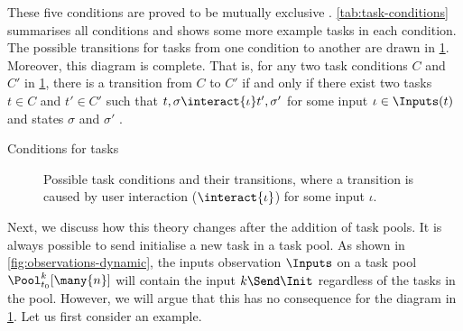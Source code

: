 These five conditions are proved to be mutually exclusive .
\cref{tab:task-conditions} summarises all conditions
and shows some more example tasks in each condition.
The possible transitions for tasks from one condition to another are drawn in \cref{fig:task-conditions}.
Moreover, this diagram is complete.
That is, for any two task conditions $C$ and $C'$ in \cref{fig:task-conditions},
there is a transition from $C$ to $C'$
if and only if there exist two tasks $t \in C$ and $t' \in C'$ such that
$t,\sigma \interact{\iota} t',\sigma'$ for some input $\iota \in \Inputs(t)$ and states $\sigma$ and $\sigma'$ .

\begin{table}
  
  \caption{Conditions for tasks}
  \label{tab:task-conditions}
\end{table}

\begin{figure}
  
  \caption{Possible task conditions and their transitions, where a transition is caused by user interaction ($\interact{\iota}$) for some input $\iota$.}
  \label{fig:task-conditions}
\end{figure}

Next, we discuss how this theory changes after the addition of task pools.
It is always possible to send initialise a new task in a task pool.
As shown in \cref{fig:observations-dynamic},
the inputs observation $\Inputs$ on a task pool $\Pool_{t_0}^k [\many{n}]$ will contain the input $k\Send\Init$
regardless of the tasks in the pool.
However, we will argue that this has no consequence for the diagram in \cref{fig:task-conditions}.
Let us first consider an example.


